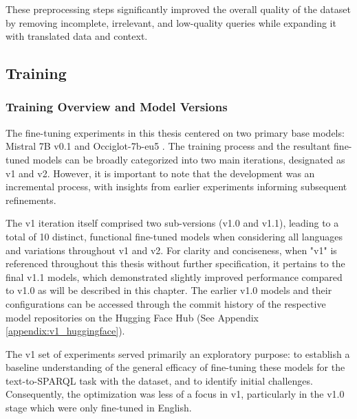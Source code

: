 These preprocessing steps significantly improved the overall quality of the dataset by removing incomplete, irrelevant, and low-quality queries while expanding it with translated data and context.
\subsection{Training}
\subsubsection{Training Overview and Model Versions}

The fine-tuning experiments in this thesis centered on two primary base models: Mistral 7B v0.1 \cite{jiang2023mistral7b} and Occiglot-7b-eu5 \cite{avramidis-etal-2024-occiglot}.
The training process and the resultant fine-tuned models can be broadly categorized into two main iterations, designated as v1 and v2.
However, it is important to note that the development was an incremental process, with insights from earlier experiments informing subsequent refinements.

The v1 iteration itself comprised two sub-versions (v1.0 and v1.1), leading to a total of 10 distinct, functional fine-tuned models when considering all languages and variations throughout v1 and v2.
For clarity and conciseness, when "v1" is referenced throughout this thesis without further specification, it pertains to the final v1.1 models, which demonstrated slightly improved performance compared to v1.0 as will be described in this chapter.
The earlier v1.0 models and their configurations can be accessed through the commit history of the respective model repositories on the Hugging Face Hub (See Appendix \ref{appendix:v1_huggingface}).

The v1 set of experiments served primarily an exploratory purpose: to establish a baseline understanding of the general efficacy of fine-tuning these models for the text-to-SPARQL task with the dataset, and to identify initial challenges.
Consequently, the optimization was less of a focus in v1, particularly in the v1.0 stage which were only fine-tuned in English.

